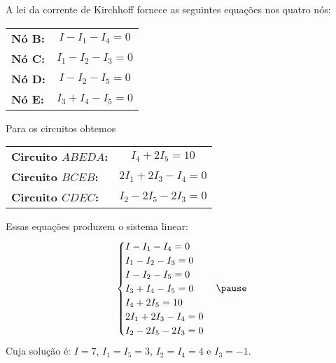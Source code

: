 \documentclass{beamer}
\begin{document}
    \begin{frame}
        \begin{figure}[!h]
            \centering
            
        \end{figure}
    \end{frame}

    \begin{frame}
        A lei da corrente de Kirchhoff \pause fornece as seguintes equações nos quatro nós:\pause
        \begin{center}
            \begin{tabular}{lc}
                \textbf{Nó B:} \pause & $I - I_1 - I_4 = 0$\pause\\
                \textbf{Nó C:} \pause & $I_1 - I_2 - I_3 = 0$\pause\\
                \textbf{Nó D:} \pause & $I - I_2 - I_5 = 0$\pause\\
                \textbf{Nó E:} \pause & $I_3 + I_4 - I_5 = 0$\pause
            \end{tabular}
        \end{center}

        Para os circuitos obtemos
        \begin{center}
            \begin{tabular}{lc}
                \textbf{Circuito $ABEDA$:} \pause & $I_4 + 2I_5 = 10$\pause\\
                \textbf{Circuito $BCEB$:} \pause & $2I_1 + 2I_3 - I_4 = 0$\pause\\
                \textbf{Circuito $CDEC$:} \pause & $I_2 - 2I_5 - 2I_3 = 0$
            \end{tabular}
        \end{center}
    \end{frame}

    \begin{frame}
        Essas equações produzem o sistema linear:
        \[
            \begin{cases}
                I - I_1 - I_4 = 0\\
                I_1 - I_2 - I_3 = 0\\
                I - I_2 - I_5 = 0\\
                I_3 + I_4 - I_5 = 0\\
                I_4 + 2I_5 = 10\\
                2I_1 + 2I_3 - I_4 = 0\\
                I_2 - 2I_5 - 2I_3 = 0
            \end{cases}\pause
        \]
        Cuja solução é: $I = 7$, $I_1 = I_5 = 3$, $I_2 = I_4 = 4$ e $I_3 = -1$.
    \end{frame}
\end{document}
